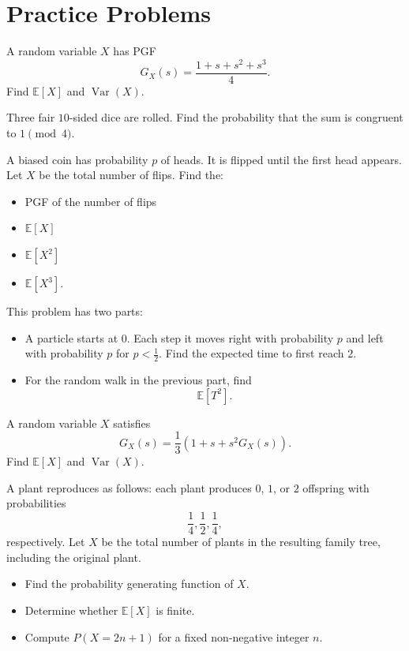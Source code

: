 \documentclass[11pt]{scrartcl}
\begin{document}
\section{Practice Problems}

\begin{problem}[1]{}
A random variable $X$ has PGF \[G_X(s)=\frac{1+s+s^2+s^3}{4}.\] Find $\mathbb{E}[X]$ and $\operatorname{Var}(X)$.
\end{problem}
\begin{problem}[2]{}
Three fair $10$-sided dice are rolled. Find the probability that the sum is congruent to $1 \pmod{4}$.
\end{problem}
\begin{problem}[3]{}
A biased coin has probability $p$ of heads. It is flipped until the first head appears. Let $X$ be the total number of flips. Find the:
\begin{itemize}
\item PGF of the number of flips
\item $\mathbb{E}[X]$
\item $\mathbb{E}[X^2]$
\item $\mathbb{E}[X^3]$.
\end{itemize}
\end{problem}
\begin{problem}[4]{}
This problem has two parts:
\begin{itemize}
\item A particle starts at $0$. Each step it moves right with probability $p$ and left with probability $p$ for $p < \tfrac{1}{2}$. Find the expected time to first reach $2$.
\item For the random walk in the previous part, find \[\mathbb{E}[T^2].\]
\end{itemize}
\end{problem}
\begin{problem}[5]{}
A random variable $X$ satisfies \[G_X(s)=\frac13(1+s+s^2G_X(s)).\] Find $\mathbb{E}[X]$ and $\operatorname{Var}(X)$.
\end{problem}
\begin{problem}[6]{}
A plant reproduces as follows: each plant produces $0$, $1$, or $2$
offspring with probabilities \[\frac14,\frac12,\frac14,\] respectively. Let $X$ be the total number of plants in the resulting family tree, including the original plant.
\begin{itemize}
\item Find the probability generating function of $X$.
\item Determine whether $\mathbb{E}[X]$ is finite.
\item Compute $P(X=2n+1)$ for a fixed non-negative integer $n$.
\end{itemize}
\end{problem}
\end{document}
